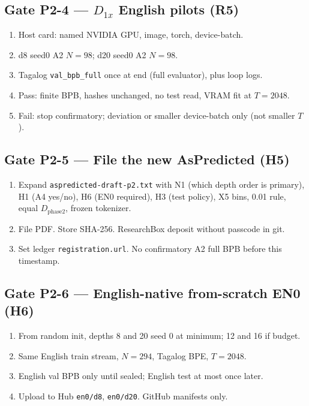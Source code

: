 \documentclass[11pt,a4paper]{article}
\begin{document}
\subsection{Gate P2-4 --- $D_{1x}$ English pilots (R5)}
\begin{enumerate}
\item Host card: named NVIDIA GPU, image, torch, device-batch.
\item d8 seed0 A2 $N=98$; d20 seed0 A2 $N=98$.
\item Tagalog \texttt{val\_bpb\_full} once at end (full evaluator), plus loop logs.
\item Pass: finite BPB, hashes unchanged, no test read, VRAM fit at $T=2048$.
\item Fail: stop confirmatory; deviation or smaller device-batch only (not smaller $T$).
\end{enumerate}

\subsection{Gate P2-5 --- File the new AsPredicted (H5)}
\begin{enumerate}
\item Expand \texttt{aspredicted-draft-p2.txt} with N1 (which depth order is primary), H1 (A4 yes/no), H6 (EN0 required), H3 (test policy), X5 bins, 0.01 rule, equal $D_{\mathrm{phase2}}$, frozen tokenizer.
\item File PDF. Store SHA-256. ResearchBox deposit without passcode in git.
\item Set ledger \texttt{registration.url}. No confirmatory A2 full BPB before this timestamp.
\end{enumerate}

\subsection{Gate P2-6 --- English-native from-scratch EN0 (H6)}
\begin{enumerate}
\item From random init, depths 8 and 20 seed 0 at minimum; 12 and 16 if budget.
\item Same English train stream, $N=294$, Tagalog BPE, $T=2048$.
\item English val BPB only until sealed; English test at most once later.
\item Upload to Hub \texttt{en0/d8}, \texttt{en0/d20}. GitHub manifests only.
\end{enumerate}
\end{document}
